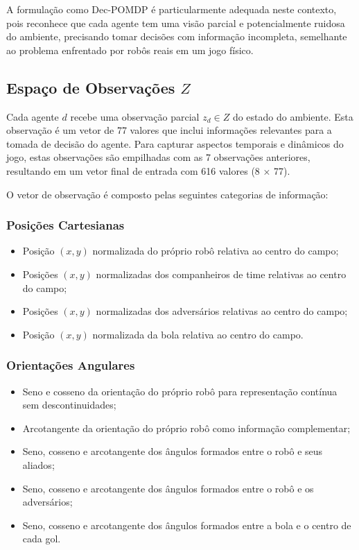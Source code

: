 A formulação como Dec-POMDP é particularmente adequada neste contexto, pois reconhece que cada agente tem uma visão parcial e potencialmente ruidosa do ambiente, precisando tomar decisões com informação incompleta, semelhante ao problema enfrentado por robôs reais em um jogo físico.

\subsection{Espaço de Observações $Z$}

Cada agente $d$ recebe uma observação parcial $z_d \in Z$ do estado do ambiente. Esta observação é um vetor de 77 valores que inclui informações relevantes para a tomada de decisão do agente. Para capturar aspectos temporais e dinâmicos do jogo, estas observações são empilhadas com as 7 observações anteriores, resultando em um vetor final de entrada com 616 valores (8 × 77).

O vetor de observação é composto pelas seguintes categorias de informação:

\subsubsection{Posições Cartesianas}
\begin{itemize}
    \item Posição $(x, y)$ normalizada do próprio robô relativa ao centro do campo;
    \item Posições $(x, y)$ normalizadas dos companheiros de time relativas ao centro do campo;
    \item Posições $(x, y)$ normalizadas dos adversários relativas ao centro do campo;
    \item Posição $(x, y)$ normalizada da bola relativa ao centro do campo.
\end{itemize}

\subsubsection{Orientações Angulares}
\begin{itemize}
    \item Seno e cosseno da orientação do próprio robô para representação contínua sem descontinuidades;
    \item Arcotangente da orientação do próprio robô como informação complementar;
    \item Seno, cosseno e arcotangente dos ângulos formados entre o robô e seus aliados;
    \item Seno, cosseno e arcotangente dos ângulos formados entre o robô e os adversários;
    \item Seno, cosseno e arcotangente dos ângulos formados entre a bola e o centro de cada gol.
\end{itemize}

